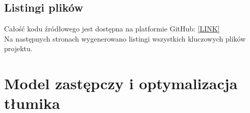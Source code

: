 \documentclass{sprawozdanie-agh}
\begin{document}
\subsection{Listingi plików}
Całość kodu źródłowego jest dostępna na platformie GitHub: \href{https://github.com/alexxior/fem-muffler}{[LINK]}\\Na następnych stronach wygenerowano listingi wszystkich kluczowych plików projektu.
\label{list1}
\label{list5}
\newpage
\label{list2}
\label{list3}
\label{list4}
\label{list7}
\label{list8}
\label{list6}
\label{list9}
\label{list10}
\newpage
\section{Model zastępczy i optymalizacja tłumika}
\end{document}
